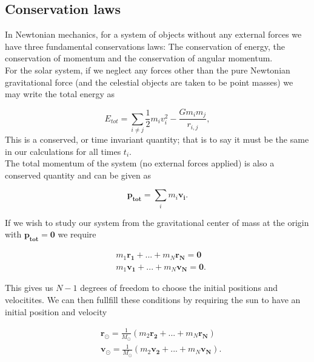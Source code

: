 \documentclass[%
 reprint,
 nobalance,
 amsmath,amssymb,
 aps,
]{revtex4-1}
\begin{document}
\subsection{\label{sec:Con}Conservation laws}
In Newtonian mechanics, for a system of objects without any external forces we have three fundamental conservations laws: The conservation of energy, the conservation of momentum and the conservation of angular momentum. \\
For the solar system, if we neglect any forces other than the pure Newtonian gravitational force (and the celestial objects are taken to be point masses) we may write the total energy as

\begin{equation}\label{eq:10}
	E_{tot} = \sum_{i \neq j}{\frac{1}{2}m_i v_{i}^{2} - \frac{Gm_i m_j}{r_{i,j}}},
\end{equation}
This is a conserved, or time invariant quantity; that is to say it must be the same in our calculations for all times $t_i$.\\
The total momentum of the system (no external forces applied) is also a conserved quantity and can be given as

\begin{equation}
	\bm{p_{tot}} = \sum_i{m_i\bm{v_i}}.
\end{equation}

If we wish to study our system from the gravitational center of mass at the origin with $\bm{p_{tot} = 0}$ we require

\begin{equation}
\begin{split}
	& m_1 \bm{r_1} + ... + m_N \bm{r_N} = \bm{0} \\
	& m_1 \bm{v_1} + ... + m_N \bm{v_N} = \bm{0}.
\end{split}
\end{equation}

This gives us $N-1$ degrees of freedom to choose the initial positions and velocitites. We can then fullfill these conditions by requiring the sun to have an initial position and velocity

\begin{equation}
\begin{split}
	& \bm{r_{\odot}} = \frac{1}{M_{\odot}}(m_2 \bm{r_2} + ... + m_N \bm{r_N}) \\
	& \bm{v_{\odot}} = \frac{1}{M_{\odot}}(m_2 \bm{v_2} + ... + m_N \bm{v_N}).
\end{split}
\end{equation}
\end{document}

